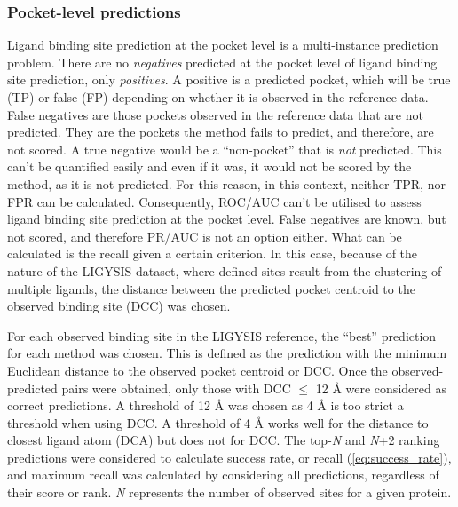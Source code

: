 \vspace{-12pt} %
\vspace{-12pt} %

\subsubsection{Pocket-level predictions}
\label{subsub:pocket_level_metrics}

Ligand binding site prediction at the pocket level is a multi-instance prediction problem. There are no \textit{negatives} predicted at the pocket level of ligand binding site prediction, only \textit{positives}. A positive is a predicted pocket, which will be true (TP) or false (FP) depending on whether it is observed in the reference data. False negatives are those pockets observed in the reference data that are not predicted. They are the pockets the method fails to predict, and therefore, are not scored. A true negative would be a ``non-pocket'' that is \textit{not} predicted. This can't be quantified easily and even if it was, it would not be scored by the method, as it is not predicted. For this reason, in this context, neither TPR, nor FPR can be calculated. Consequently, ROC/AUC can't be utilised to assess ligand binding site prediction at the pocket level. False negatives are known, but not scored, and therefore PR/AUC is not an option either. What can be calculated is the recall given a certain criterion. In this case, because of the nature of the LIGYSIS dataset, where defined sites result from the clustering of multiple ligands, the distance between the predicted pocket centroid to the observed binding site (DCC) was chosen.

For each observed binding site in the LIGYSIS reference, the ``best'' prediction for each method was chosen. This is defined as the prediction with the minimum Euclidean distance to the observed pocket centroid or DCC. Once the observed-predicted pairs were obtained, only those with DCC $\leq$ 12 \AA{} were considered as correct predictions. A threshold of 12 \AA{} was chosen as 4 \AA{} is too strict a threshold when using DCC. A threshold of 4 \AA{} works well for the distance to closest ligand atom (DCA) but does not for DCC. The top-\textit{N} and \textit{N}+2 ranking predictions were considered to calculate success rate, or recall (\autoref{eq:success_rate}), and maximum recall was calculated by considering all predictions, regardless of their score or rank. \textit{N} represents the number of observed sites for a given protein.

